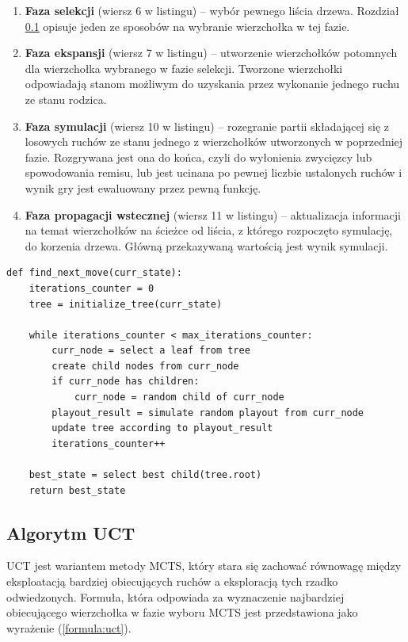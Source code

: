 \documentclass[a4paper,12pt]{article}
\begin{document}
\begin{enumerate}
	\item \textbf{Faza selekcji} (wiersz 6 w listingu) -- wybór pewnego liścia drzewa. Rozdział \ref{subsec:uct} opisuje jeden ze sposobów na wybranie wierzchołka w tej fazie.
	\item \textbf{Faza ekspansji} (wiersz 7 w listingu) -- utworzenie wierzchołków potomnych dla wierzchołka wybranego w fazie selekcji. Tworzone wierzchołki odpowiadają stanom możliwym do uzyskania przez wykonanie jednego ruchu ze stanu rodzica.
	\item \textbf{Faza symulacji} (wiersz 10 w listingu) -- rozegranie partii składającej się z losowych ruchów ze stanu jednego z wierzchołków utworzonych w poprzedniej fazie. Rozgrywana jest ona do końca, czyli do wyłonienia zwycięzcy lub spowodowania remisu, lub jest ucinana po pewnej liczbie ustalonych ruchów i wynik gry jest ewaluowany przez pewną funkcję.
	\item \textbf{Faza propagacji wstecznej} (wiersz 11 w listingu) -- aktualizacja informacji na temat wierzchołków na ścieżce od liścia, z którego rozpoczęto symulację, do korzenia drzewa. Główną przekazywaną wartością jest wynik symulacji.
\end{enumerate}

\begin{minipage}{\linewidth} %
	\begin{lstlisting}[caption={Pseudokod algorytmu Monte Carlo Tree Search}, label=lst:mcts, style=mystyle]
def find_next_move(curr_state):
	iterations_counter = 0
	tree = initialize_tree(curr_state)
	
	while iterations_counter < max_iterations_counter:
		curr_node = select a leaf from tree
		create child nodes from curr_node
		if curr_node has children:
			curr_node = random child of curr_node
		playout_result = simulate random playout from curr_node     
		update tree according to playout_result                     
		iterations_counter++
	
	best_state = select best child(tree.root) 
	return best_state
	\end{lstlisting}
\end{minipage}


\subsection{Algorytm UCT} \label{subsec:uct}
UCT jest wariantem metody MCTS, który stara się zachować równowagę między eksploatacją bardziej obiecujących ruchów a eksploracją tych rzadko odwiedzonych. Formuła, która odpowiada za wyznaczenie najbardziej obiecującego wierzchołka w fazie wyboru MCTS jest przedstawiona jako wyrażenie (\ref{formula:uct}).
\end{document}
